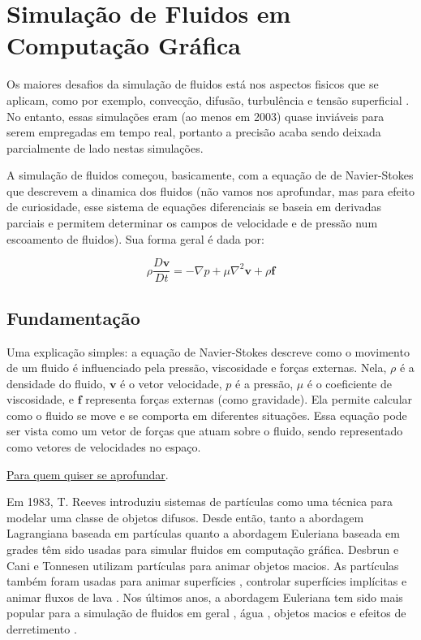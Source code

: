 \section{Simulação de Fluidos em Computação Gráfica}

Os maiores desafios da simulação de fluidos está nos aspectos fisicos que se aplicam, como por exemplo, convecção, difusão, turbulência e tensão superficial \cite{desbrun1996}. No entanto, essas simulações eram (ao menos em 2003) quase inviáveis para serem empregadas em tempo real, portanto a precisão acaba sendo deixada parcialmente de lado nestas simulações.

A simulação de fluidos começou, basicamente, com a equação de de Navier-Stokes que descrevem a dinamica dos fluidos (não vamos nos aprofundar, mas para efeito de curiosidade, esse sistema de equações diferenciais se baseia em derivadas parciais e permitem determinar os campos de velocidade e de pressão num escoamento de fluidos). Sua forma geral é dada por:


$$
\rho \frac{D\mathbf{v}}{Dt} = -\nabla p + \mu \nabla^2 \mathbf{v} + \rho \mathbf{f}
$$

\subsection{Fundamentação}

Uma explicação simples: a equação de Navier-Stokes descreve como o movimento de um fluido é influenciado pela pressão, viscosidade e forças externas. Nela, $\rho$ é a densidade do fluido, $\mathbf{v}$ é o vetor velocidade, $p$ é a pressão, $\mu$ é o coeficiente de viscosidade, e $\mathbf{f}$ representa forças externas (como gravidade). Ela permite calcular como o fluido se move e se comporta em diferentes situações. Essa equação pode ser vista como um vetor de forças que atuam sobre o fluido, sendo representado como vetores de velocidades no espaço.

\href{https://pt.wikipedia.org/wiki/Equa\%C3\%A7\%C3\%B5es\_de\_Navier-Stokes}{Para quem quiser se aprofundar}.

Em 1983, T. Reeves \cite{reeves1983} introduziu sistemas de partículas como uma técnica para modelar uma classe de objetos difusos. Desde então, tanto a abordagem Lagrangiana baseada em partículas quanto a abordagem Euleriana baseada em grades têm sido usadas para simular fluidos em computação gráfica. Desbrun e Cani \cite{desbrun1996} e Tonnesen \cite{tonnesen1998} utilizam partículas para animar objetos macios. As partículas também foram usadas para animar superfícies \cite{witkin1991}, controlar superfícies implícitas \cite{bloomenthal1997} e animar fluxos de lava \cite{carlson2002}. Nos últimos anos, a abordagem Euleriana tem sido mais popular para a simulação de fluidos em geral \cite{fedkiw2001}, água \cite{stam1999, foster1996, enright2002}, objetos macios \cite{muller2002} e efeitos de derretimento \cite{carlson2002}.

